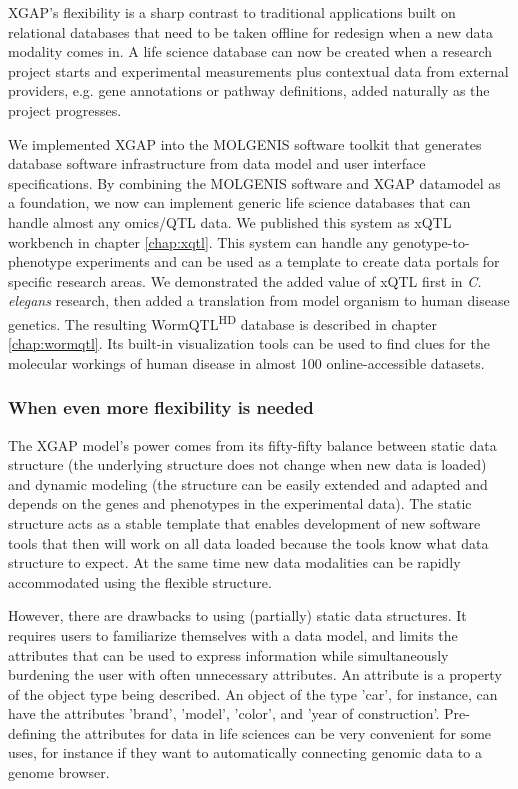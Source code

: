 XGAP’s flexibility is a sharp contrast to traditional applications built on relational databases that need to be taken offline for redesign when a new data modality comes in.
A life science database can now be created when a research project starts and experimental measurements plus contextual data from external providers, e.g. gene annotations or pathway definitions, added naturally as the project progresses.

We implemented XGAP into the MOLGENIS\cite{Swertz_2010a} software toolkit that generates database software infrastructure from data model and user interface specifications.
By combining the MOLGENIS software and XGAP datamodel as a foundation, we now can implement generic life science databases that can handle almost any omics/QTL data.
We published this system as xQTL workbench in chapter \ref{chap:xqtl}.
This system can handle any genotype-to-phenotype experiments and can be used as a template to create data portals for specific research areas.
We demonstrated the added value of xQTL first in \textsl{C. elegans} research\cite{Snoek_2012}, then added a translation from model organism to human disease genetics.
The resulting WormQTL\textsuperscript{HD} database\cite{van_der_Velde_2013a} is described in chapter \ref{chap:wormqtl}.
Its built-in visualization tools can be used to find clues for the molecular workings of human disease in almost 100 online-accessible datasets.

\subsubsection*{When even more flexibility is needed}

The XGAP model’s power comes from its fifty-fifty balance between static data structure (the underlying structure does not change when new data is loaded) and dynamic modeling (the structure can be easily extended and adapted and depends on the genes and phenotypes in the experimental data).
The static structure acts as a stable template that enables development of new software tools that then will work on all data loaded because the tools know what data structure to expect.
At the same time new data modalities can be rapidly accommodated using the flexible structure.

However, there are drawbacks to using (partially) static data structures.
It requires users to familiarize themselves with a data model, and limits the attributes that can be used to express information while simultaneously burdening the user with often unnecessary attributes.
An attribute is a property of the object type being described.
An object of the type 'car', for instance, can have the attributes 'brand', 'model', 'color', and 'year of construction'.
Pre-defining the attributes for data in life sciences can be very convenient for some uses, for instance if they want to automatically connecting genomic data to a genome browser.

